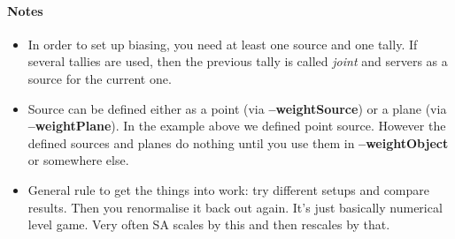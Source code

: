 \paragraph{Notes}
\begin{itemize}
\item In order to set up biasing, you need at least one source and one tally. If several tallies are used, then the previous tally is called {\em joint} and servers as a source for the current one.
\item Source can be defined either as a point (via {\bf --weightSource}) or a plane (via {\bf --weightPlane}). In the example above we defined point source.
  However the defined sources and planes do nothing until you use them in {\bf --weightObject} or somewhere else.
\item General rule to get the things into work: try different setups and compare results. Then you renormalise it back out again. It's just basically numerical level game.
  Very often SA scales by this and then rescales by that.
\end{itemize}


